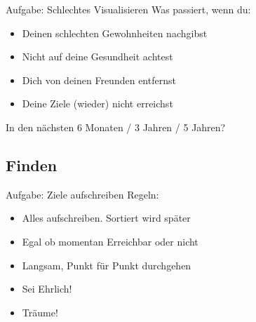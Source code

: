 \begin{frame}[c]{Aufgabe: Schlechtes Visualisieren}
    Was passiert, wenn du:
    \begin{itemize}[<+(1)->]
        \item Deinen schlechten Gewohnheiten nachgibst
        \item Nicht auf deine Gesundheit achtest
        \item Dich von deinen Freunden entfernst
        \item Deine Ziele (wieder) nicht erreichst
    \end{itemize}
    \pause
    In den nächsten 6 Monaten / 3 Jahren / 5 Jahren?

\end{frame}





\subsection{Finden}


\begin{frame}[c]{Aufgabe: Ziele aufschreiben}
    Regeln:
    \begin{itemize}[<+(1)->]
        \item Alles aufschreiben. Sortiert wird später
        \item Egal ob momentan Erreichbar oder nicht
        \item Langsam, Punkt für Punkt durchgehen
        \item Sei Ehrlich!
        \item Träume!
    \end{itemize}
\end{frame}



